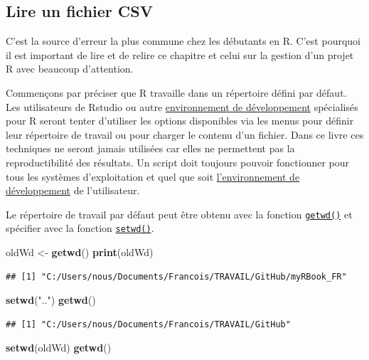 \documentclass[]{book}
\newenvironment{Shaded}{\begin{snugshade}}{\end{snugshade}}
\newcommand{\KeywordTok}[1]{\textcolor[rgb]{0.13,0.29,0.53}{\textbf{#1}}}
\newcommand{\NormalTok}[1]{#1}
\newcommand{\StringTok}[1]{\textcolor[rgb]{0.31,0.60,0.02}{#1}}
\begin{document}
\hypertarget{l016readCSV}{%
\subsection{Lire un fichier CSV}\label{l016readCSV}}

C'est la source d'erreur la plus commune chez les débutants en R. C'est pourquoi il est important de lire et de relire ce chapitre et celui sur la gestion d'un projet R avec beaucoup d'attention.

Commençons par préciser que R travaille dans un répertoire défini par défaut. Les utilisateurs de Rstudio ou autre \protect\hyperlink{IDE}{environnement de développement} spécialisés pour R seront tenter d'utiliser les options disponibles via les menus pour définir leur répertoire de travail ou pour charger le contenu d'un fichier. Dans ce livre ces techniques ne seront jamais utilisées car elles ne permettent pas la reproductibilité des résultats. Un script doit toujours pouvoir fonctionner pour tous les systèmes d'exploitation et quel que soit \protect\hyperlink{IDE}{l'environnement de développement} de l'utilisateur.

Le répertoire de travail par défaut peut être obtenu avec la fonction \protect\hyperlink{l015getwd}{\texttt{getwd()}} et spécifier avec la fonction \protect\hyperlink{l015setwd}{\texttt{setwd()}}.

\begin{Shaded}
\begin{Highlighting}[]
\NormalTok{oldWd <-}\StringTok{ }\KeywordTok{getwd}\NormalTok{()}
\KeywordTok{print}\NormalTok{(oldWd)}
\end{Highlighting}
\end{Shaded}

\begin{verbatim}
## [1] "C:/Users/nous/Documents/Francois/TRAVAIL/GitHub/myRBook_FR"
\end{verbatim}

\begin{Shaded}
\begin{Highlighting}[]
\KeywordTok{setwd}\NormalTok{(}\StringTok{".."}\NormalTok{)}
\KeywordTok{getwd}\NormalTok{()}
\end{Highlighting}
\end{Shaded}

\begin{verbatim}
## [1] "C:/Users/nous/Documents/Francois/TRAVAIL/GitHub"
\end{verbatim}

\begin{Shaded}
\begin{Highlighting}[]
\KeywordTok{setwd}\NormalTok{(oldWd)}
\KeywordTok{getwd}\NormalTok{()}
\end{Highlighting}
\end{Shaded}
\end{document}
